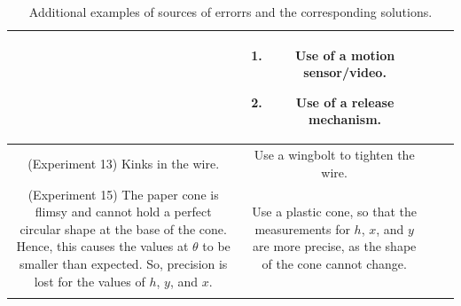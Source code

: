 \documentclass[oneside]{book}
\begin{document}
\begin{itemize}
\begin{longtable}{|Sc|Sc|}
\begin{minipage}{0.5\textwidth-25.2pt}
        \end{minipage}&
        \begin{minipage}{0.5\textwidth-25.2pt}
            \begin{enumerate}
                \item Use of a motion sensor/video.
                \item Use of a release mechanism.
            \end{enumerate}
        \end{minipage}\\
        \hline
        \begin{minipage}{0.5\textwidth-25.2pt}
            (Experiment 13) Kinks in the wire.
        \end{minipage} & 
        \begin{minipage}{0.5\textwidth-25.2pt}
            Use a wingbolt to tighten the wire.
        \end{minipage}\\
        \hline
        \begin{minipage}{0.5\textwidth-25.2pt}
            (Experiment 15) The paper cone is flimsy and cannot hold a perfect circular shape at the base of the cone. Hence, this causes the values at \(\theta\) to be smaller than expected. So, precision is lost for the values of \(h\), \(y\), and \(x\).
        \end{minipage}&
        \begin{minipage}{0.5\textwidth-25.2pt}
            Use a plastic cone, so that the measurements for \(h\), \(x\), and \(y\) are more precise, as the shape of the cone cannot change.
        \end{minipage}\\
        \hline
            
            
    \caption{Additional examples of sources of errorrs and the corresponding solutions.}
    \label{table:sources-of-error-and-solutions}
    \end{longtable}
\end{itemize}
\end{document}

